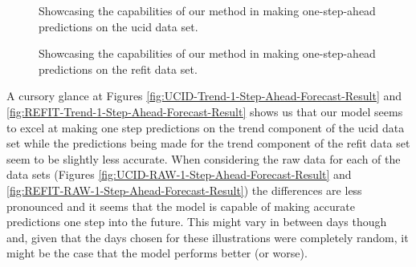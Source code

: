 \begin{figure}[H]
    \begin{adjustwidth}{-3.0cm}{-3.0cm}%
            \myfloatalign
             \quad
             \quad
            \caption{Showcasing the capabilities of our method in making one-step-ahead predictions on the \gls{ucid} data set.}
    \end{adjustwidth}
\end{figure}

\begin{figure}[H]
    \begin{adjustwidth}{-3.0cm}{-3.0cm}%
            \myfloatalign
             \quad
             \quad
            \caption{Showcasing the capabilities of our method in making one-step-ahead predictions on the \gls{refit} data set.}
    \end{adjustwidth}
\end{figure}

\noindent \newline A cursory glance at Figures \ref{fig:UCID-Trend-1-Step-Ahead-Forecast-Result} and \ref{fig:REFIT-Trend-1-Step-Ahead-Forecast-Result} shows us that our model seems to excel at making one step predictions on the trend component of the \gls{ucid} data set while the predictions being made for the trend component of the \gls{refit} data set seem to be slightly less accurate. When considering the raw data for each of the data sets (Figures \ref{fig:UCID-RAW-1-Step-Ahead-Forecast-Result} and \ref{fig:REFIT-RAW-1-Step-Ahead-Forecast-Result}) the differences are less pronounced and it seems that the model is capable of making accurate predictions one step into the future. This might vary in between days though and, given that the days chosen for these illustrations were completely random, it might be the case that the model performs better (or worse).

